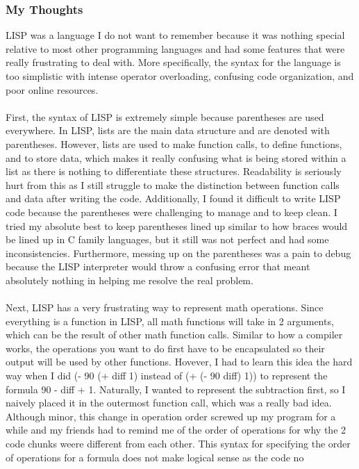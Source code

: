 \documentclass[letterpaper, 10pt, DIV=13]{scrartcl}
\numberwithin{equation}{section}
\numberwithin{figure}{section}
\numberwithin{table}{section}
\begin{document}
\subsubsection{My Thoughts}
LISP was a language I do not want to remember because it was nothing special relative to most other programming languages and had some features 
that were really frustrating to deal with. More specifically, the syntax for the language is too simplistic with intense operator overloading, 
confusing code organization, and poor online resources.
\\ \\
First, the syntax of LISP is extremely simple because parentheses are used everywhere. In LISP, lists are the main data structure and are denoted with 
parentheses. However, lists are used to make function calls, to define functions, and to store data, which makes it really confusing what is being stored within a 
list as there is nothing to differentiate these structures. Readability is seriously hurt from this as I still struggle to make the distinction between function 
calls and data after writing the code. Additionally, I found it difficult to write LISP code because the parentheses were challenging to manage and to keep clean. 
I tried my absolute best to keep parentheses lined up similar to how braces would be lined up in C family languages, but it still was not perfect and had some 
inconsistencies. Furthermore, messing up on the parentheses was a pain to debug because the LISP interpreter would throw a confusing error that meant absolutely 
nothing in helping me resolve the real problem.
\\ \\
Next, LISP has a very frustrating way to represent math operations. Since everything is a function in LISP, all math functions will take in 2 arguments, which 
can be the result of other math function calls. Similar to how a compiler works, the operations you want to do first have to be encapsulated so their output 
will be used by other functions. Hovever, I had to learn this idea the hard way when I did (- 90 (+ diff 1) instead of (+ (- 90 diff) 1)) to represent the formula
90 - diff + 1. Naturally, I wanted to represent the subtraction first, so I naively placed it in the outermost function call, which was a really bad idea.
Although minor, this change in operation order screwed up my program for a while and my friends had to remind me of the order of operations for why the 2 
code chunks weere different from each other. This syntax for specifying the order of operations for a formula does not make logical sense as the code no 
\end{document}
